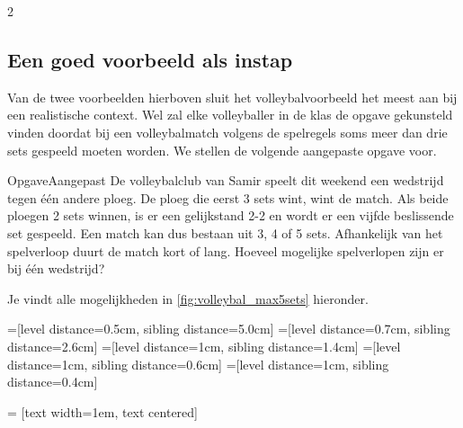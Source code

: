 \begin{multicols}{2}
\subsection{Een goed voorbeeld als instap}
Van de twee voorbeelden hierboven sluit het volleybalvoorbeeld het meest aan bij een realistische context. Wel zal elke volleyballer in de klas de opgave gekunsteld vinden doordat bij een volleybalmatch volgens de spelregels soms meer dan drie sets gespeeld moeten worden. We stellen de volgende aangepaste opgave voor. 
\begin{kader}{Opgave}{Aangepast}
De volleybalclub van Samir speelt dit weekend een wedstrijd tegen één andere ploeg. De ploeg die eerst 3 sets wint, wint de match. Als beide ploegen 2 sets winnen, is er een gelijkstand 2-2 en wordt er een vijfde beslissende set gespeeld. Een match kan dus bestaan uit 3, 4 of 5 sets. Afhankelijk van het spelverloop duurt de match kort of lang. Hoeveel mogelijke spelverlopen zijn er bij één wedstrijd? 
\end{kader}

Je vindt alle mogelijkheden in \autoref{fig:volleybal_max5sets} hieronder. 

\begin{afbeeldingenv}
=[level distance=0.5cm, sibling distance=5.0cm]
=[level distance=0.7cm, sibling distance=2.6cm]
=[level distance=1cm, sibling distance=1.4cm]
=[level distance=1cm, sibling distance=0.6cm]
=[level distance=1cm, sibling distance=0.4cm]

 = [text width=1em, text centered]


\end{afbeeldingenv}
\end{multicols}

